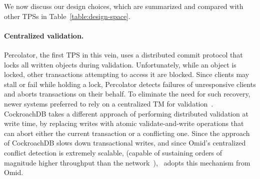 We now discuss our design choices, which are summarized and compared with other TPSs in  Table~\ref{table:design-space}. 



\paragraph{Centralized validation.}
Percolator, the first TPS in this vein, uses a distributed commit protocol that locks all written objects during validation. 
Unfortunately, while an object is locked, other transactions attempting to access it are blocked.
Since clients may stall or fail while holding a lock, Percolator detects failures of unresponsive clients and aborts transactions on their behalf. 
To eliminate the need for such recovery, newer systems preferred to rely on 
a centralized TM for validation~\cite{OmidICDE2014,tephra,Omid2017}.
CockroachDB takes a different approach of performing distributed validation at write time, by replacing writes with atomic validate-and-write operations that can abort either the current transaction or a conflicting one. 
Since the approach of CockroachDB slows down transactional writes, and since Omid's centralized conflict detection is extremely scalable, 
(capable of sustaining orders of magnitude higher throughput than the network~\cite{Omid2017}), 
\sys\ adopts this mechanism from Omid. 

